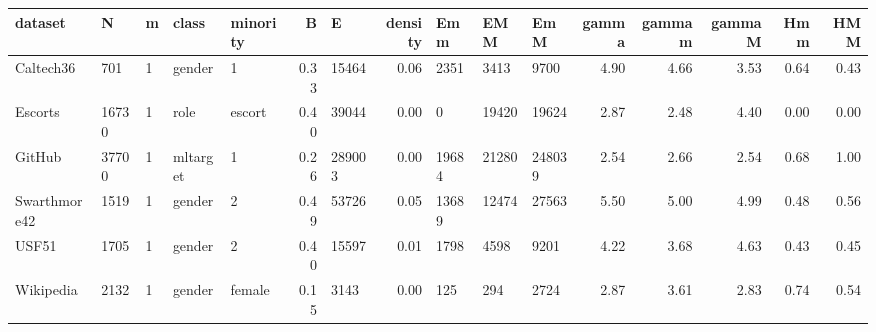 \begin{tabular}{lllllrlrlllrrrrr}
\toprule
      dataset &      N &  m &     class & minority &    B &       E &  density &    Emm &    EMM &     EmM &  gamma &  gammam &  gammaM &  Hmm &  HMM \\
\midrule
    Caltech36 &    701 &  1 &    gender &        1 & 0.33 &   15464 &     0.06 &   2351 &   3413 &    9700 &   4.90 &    4.66 &    3.53 & 0.64 & 0.43 \\
      Escorts &  16730 &  1 &      role &   escort & 0.40 &   39044 &     0.00 &      0 &  19420 &   19624 &   2.87 &    2.48 &    4.40 & 0.00 & 0.00 \\
       GitHub &  37700 &  1 &  mltarget &        1 & 0.26 &  289003 &     0.00 &  19684 &  21280 &  248039 &   2.54 &    2.66 &    2.54 & 0.68 & 1.00 \\
 Swarthmore42 &   1519 &  1 &    gender &        2 & 0.49 &   53726 &     0.05 &  13689 &  12474 &   27563 &   5.50 &    5.00 &    4.99 & 0.48 & 0.56 \\
        USF51 &   1705 &  1 &    gender &        2 & 0.40 &   15597 &     0.01 &   1798 &   4598 &    9201 &   4.22 &    3.68 &    4.63 & 0.43 & 0.45 \\
    Wikipedia &   2132 &  1 &    gender &   female & 0.15 &    3143 &     0.00 &    125 &    294 &    2724 &   2.87 &    3.61 &    2.83 & 0.74 & 0.54 \\
\bottomrule
\end{tabular}
